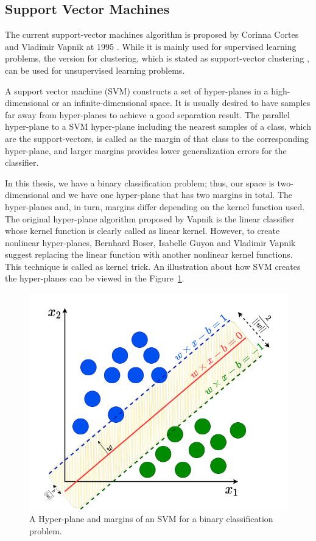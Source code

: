 \subsection{Support Vector Machines}

The current support-vector machines algorithm is proposed by Corinna Cortes and Vladimir Vapnik at 1995 \cite{svm_original}. While it is mainly used for supervised learning problems, the version for clustering, which is stated as support-vector clustering \cite{support_vector_clustering}, can be used for unsupervised learning problems.

A support vector machine (SVM) constructs a set of hyper-planes in a high-dimensional or an infinite-dimensional space. It is usually desired to have samples far away from hyper-planes to achieve a good separation result. The parallel hyper-plane to a SVM hyper-plane including the nearest samples of a class, which are the support-vectors, is called as the margin of that class to the corresponding hyper-plane, and larger margins provides lower generalization errors for the classifier. 

In this thesis, we have a binary classification problem; thus, our space is two-dimensional and we have one hyper-plane that has two margins in total. The hyper-planes and, in turn, margins differ depending on the kernel function used. The original hyper-plane algorithm proposed by Vapnik \cite{svm_original} is the linear classifier whose kernel function is clearly called as linear kernel. However, to create nonlinear hyper-planes, Bernhard Boser, Isabelle Guyon  and Vladimir Vapnik \cite{svm_kernel} suggest replacing the linear function with another nonlinear kernel functions. This technique is called as kernel trick. An illustration about how SVM creates the hyper-planes can be viewed in the Figure~\ref{fig:simple_svm}.

\begin{figure}[h]
	\centering
	\includegraphics[width=.6\linewidth]{fig/simpleSVMBinary.png}
	\vspace*{2mm}
	\caption{A Hyper-plane and margins of an SVM for a binary classification problem.}
	\label{fig:simple_svm}
\end{figure}

